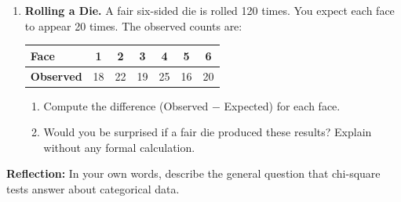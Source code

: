 \documentclass[10pt]{article}
\begin{document}
\begin{enumerate}
  \item \textbf{Rolling a Die.} A fair six-sided die is rolled 120 times. You expect
        each face to appear 20 times. The observed counts are:

        \vspace{0.05in}
        \renewcommand{\arraystretch}{1.3}
        \begin{tabularx}{0.75\linewidth}{Xcccccc}
            \textbf{Face}     & 1  & 2  & 3  & 4  & 5  & 6  \\
            \hline
            \textbf{Observed} & 18 & 22 & 19 & 25 & 16 & 20 \\
        \end{tabularx}

        \begin{enumerate}[label=\alph*.]
          \boxguard[15]
          \item Compute the difference (Observed $-$ Expected) for each face.

          \boxguard[15]
          \item Would you be surprised if a fair die produced these results?
                Explain without any formal calculation.
        \end{enumerate}

\end{enumerate}

\begin{reflectionbox}
\textbf{Reflection:} In your own words, describe the general question that chi-square
tests answer about categorical data.

\end{reflectionbox}
\end{document}
